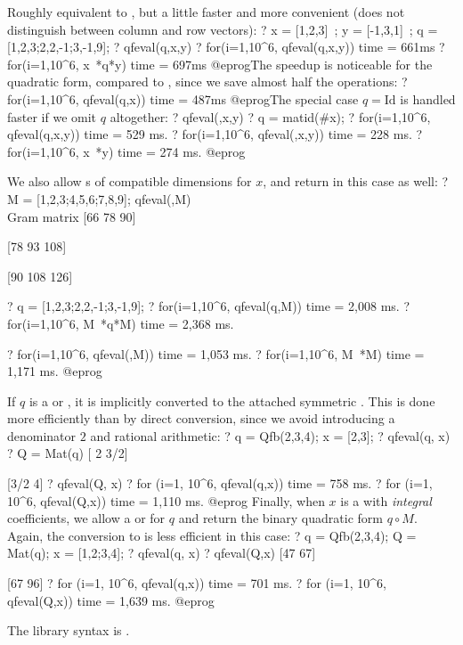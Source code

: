 Roughly equivalent to , but a little faster and
more convenient (does not distinguish between column and row vectors):
\bprog
? x = [1,2,3]~; y = [-1,3,1]~; q = [1,2,3;2,2,-1;3,-1,9];
? qfeval(q,x,y)
? for(i=1,10^6, qfeval(q,x,y))
time = 661ms
? for(i=1,10^6, x~*q*y)
time = 697ms
@eprog\noindent The speedup is noticeable for the quadratic form,
compared to , since we save almost half the
operations:
\bprog
? for(i=1,10^6, qfeval(q,x))
time = 487ms
@eprog\noindent The special case $q = \text{Id}$ is handled faster if we
omit $q$ altogether:
\bprog
? qfeval(,x,y)
? q = matid(#x);
? for(i=1,10^6, qfeval(q,x,y))
time = 529 ms.
? for(i=1,10^6, qfeval(,x,y))
time = 228 ms.
? for(i=1,10^6, x~*y)
time = 274 ms.
@eprog

We also allow s of compatible dimensions for $x$,
and return  in this case as well:
\bprog
? M = [1,2,3;4,5,6;7,8,9]; qfeval(,M) \\ Gram matrix
[66  78  90]

[78  93 108]

[90 108 126]

? q = [1,2,3;2,2,-1;3,-1,9];
? for(i=1,10^6, qfeval(q,M))
time = 2,008 ms.
? for(i=1,10^6, M~*q*M)
time = 2,368 ms.

? for(i=1,10^6, qfeval(,M))
time = 1,053 ms.
? for(i=1,10^6, M~*M)
time = 1,171 ms.
@eprog

If $q$ is a  or , it is implicitly converted to the
attached symmetric . This is done more
efficiently than by direct conversion, since we avoid introducing a
denominator $2$ and rational arithmetic:
\bprog
? q = Qfb(2,3,4); x = [2,3];
? qfeval(q, x)
? Q = Mat(q)
 [  2 3/2]

 [3/2   4]
? qfeval(Q, x)
? for (i=1, 10^6, qfeval(q,x))
time = 758 ms.
? for (i=1, 10^6, qfeval(Q,x))
time = 1,110 ms.
@eprog
Finally, when $x$ is a  with \emph{integral} coefficients, we allow
a  or  for $q$ and return the binary
quadratic form $q \circ M$. Again, the conversion to  is less
efficient in this case:
\bprog
? q = Qfb(2,3,4); Q = Mat(q); x = [1,2;3,4];
? qfeval(q, x)
? qfeval(Q,x)
[47 67]

[67 96]
? for (i=1, 10^6, qfeval(q,x))
time = 701 ms.
? for (i=1, 10^6, qfeval(Q,x))
time = 1,639 ms.
@eprog

The library syntax is .

